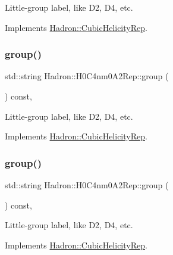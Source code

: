 Little-\/group label, like D2, D4, etc. 

Implements \mbox{\hyperlink{structHadron_1_1CubicHelicityRep_a101a7d76cd8ccdad0f272db44b766113}{Hadron\+::\+Cubic\+Helicity\+Rep}}.

\mbox{\label{structHadron_1_1H0C4nm0A2Rep_aef42f0970df5b016741ddfeccf659871}} 
\subsubsection{\texorpdfstring{group()}{group()}\hspace{0.1cm}{\footnotesize\ttfamily [2/3]}}
{\footnotesize\ttfamily std\+::string Hadron\+::\+H0\+C4nm0\+A2\+Rep\+::group (\begin{DoxyParamCaption}{ }\end{DoxyParamCaption}) const\hspace{0.3cm}{\ttfamily [inline]}, {\ttfamily [virtual]}}

Little-\/group label, like D2, D4, etc. 

Implements \mbox{\hyperlink{structHadron_1_1CubicHelicityRep_a101a7d76cd8ccdad0f272db44b766113}{Hadron\+::\+Cubic\+Helicity\+Rep}}.

\mbox{\label{structHadron_1_1H0C4nm0A2Rep_aef42f0970df5b016741ddfeccf659871}} 
\subsubsection{\texorpdfstring{group()}{group()}\hspace{0.1cm}{\footnotesize\ttfamily [3/3]}}
{\footnotesize\ttfamily std\+::string Hadron\+::\+H0\+C4nm0\+A2\+Rep\+::group (\begin{DoxyParamCaption}{ }\end{DoxyParamCaption}) const\hspace{0.3cm}{\ttfamily [inline]}, {\ttfamily [virtual]}}

Little-\/group label, like D2, D4, etc. 

Implements \mbox{\hyperlink{structHadron_1_1CubicHelicityRep_a101a7d76cd8ccdad0f272db44b766113}{Hadron\+::\+Cubic\+Helicity\+Rep}}.

